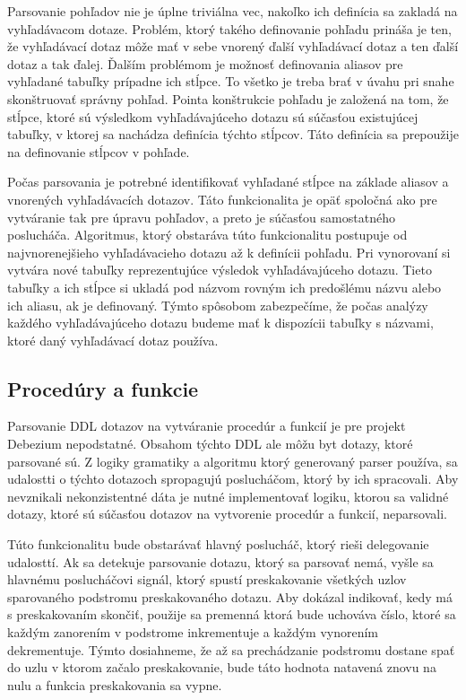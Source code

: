 Parsovanie pohľadov nie je úplne triviálna vec, nakoľko ich definícia sa zakladá na vyhľadávacom dotaze. Problém, ktorý takého definovanie pohľadu prináša je ten, že vyhľadávací dotaz môže mať v sebe vnorený ďalší vyhľadávací dotaz a ten ďalší dotaz a tak ďalej. Ďalším problémom je možnosť definovania aliasov pre vyhľadané tabuľky prípadne ich stĺpce. To všetko je treba brať v úvahu pri snahe skonštruovať správny pohľad. Pointa konštrukcie pohľadu je založená na tom, že stĺpce, ktoré sú výsledkom vyhľadávajúceho dotazu sú súčasťou existujúcej tabuľky, v ktorej sa nachádza definícia týchto stĺpcov. Táto definícia sa prepoužije na definovanie stĺpcov v pohľade. 

Počas parsovania je potrebné identifikovať vyhľadané stĺpce na základe aliasov a vnorených vyhľadávacích dotazov. Táto funkcionalita je opäť spoločná ako pre vytváranie tak pre úpravu pohľadov, a preto je súčasťou samostatného poslucháča. Algoritmus, ktorý obstaráva túto funkcionalitu postupuje od najvnorenejšieho vyhľadávacieho dotazu až k definícii pohľadu. Pri vynorovaní si vytvára nové tabuľky reprezentujúce výsledok vyhľadávajúceho dotazu. Tieto tabuľky a ich stĺpce si ukladá pod názvom rovným ich predošlému názvu alebo ich aliasu, ak je definovaný. Týmto spôsobom zabezpečíme, že počas analýzy každého vyhľadávajúceho dotazu budeme mať k dispozícii tabuľky s názvami, ktoré daný vyhľadávací dotaz používa.

\subsection{Procedúry a funkcie}
Parsovanie DDL dotazov na vytváranie procedúr a funkcií je pre projekt Debezium nepodstatné. Obsahom týchto DDL ale môžu byt dotazy, ktoré parsované sú. Z logiky gramatiky a algoritmu ktorý generovaný parser používa, sa udalostti o týchto dotazoch spropagujú poslucháčom, ktorý by ich spracovali. Aby nevznikali nekonzistentné dáta je nutné implementovať logiku, ktorou sa validné dotazy, ktoré sú súčasťou dotazov na vytvorenie procedúr a funkcií, neparsovali.

Túto funkcionalitu bude obstarávať hlavný poslucháč, ktorý rieši delegovanie udalosttí. Ak sa detekuje parsovanie dotazu, ktorý sa parsovať nemá, vyšle sa hlavnému poslucháčovi signál, ktorý spustí preskakovanie všetkých uzlov sparovaného podstromu preskakovaného dotazu. Aby dokázal indikovať, kedy má s preskakovaním skončiť, použije sa premenná ktorá bude uchováva číslo, ktoré sa každým zanorením v podstrome inkrementuje a každým vynorením dekrementuje. Týmto dosiahneme, že až sa prechádzanie podstromu dostane spať do uzlu v ktorom začalo preskakovanie, bude táto hodnota natavená znovu na nulu a funkcia preskakovania sa vypne.

